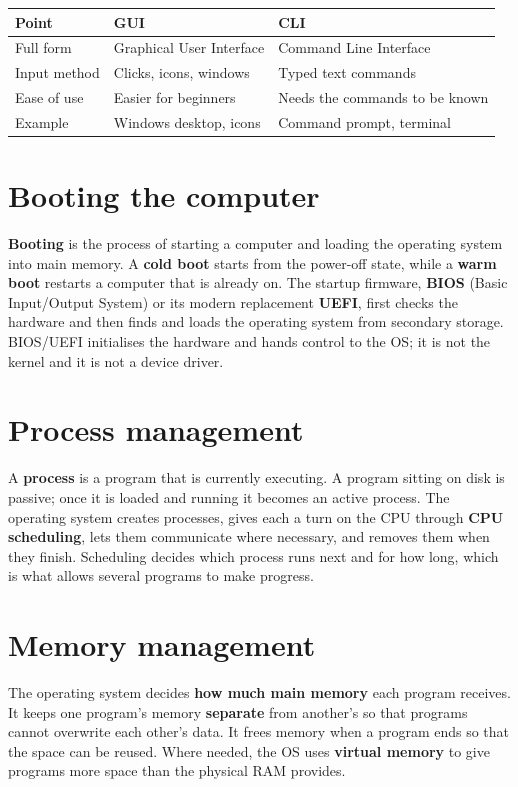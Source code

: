 \documentclass[11pt]{article}
\begin{document}
\begin{center}
\begin{tabular}{p{}p{}p{}}
\toprule
\textbf{Point} & \textbf{GUI} & \textbf{CLI} \\
\midrule
Full form & Graphical User Interface & Command Line Interface \\
Input method & Clicks, icons, windows & Typed text commands \\
Ease of use & Easier for beginners & Needs the commands to be known \\
Example & Windows desktop, icons & Command prompt, terminal \\
\bottomrule
\end{tabular}
\end{center}

\section{Booting the computer}
\textbf{Booting} is the process of starting a computer and loading the
operating system into main memory. A \textbf{cold boot} starts from the
power-off state, while a \textbf{warm boot} restarts a computer that is already
on. The startup firmware, \textbf{BIOS} (Basic Input/Output System) or its
modern replacement \textbf{UEFI}, first checks the hardware and then finds and
loads the operating system from secondary storage. BIOS/UEFI initialises the
hardware and hands control to the OS; it is not the kernel and it is not a
device driver.

\section{Process management}
A \textbf{process} is a program that is currently executing. A program sitting
on disk is passive; once it is loaded and running it becomes an active
process. The operating system creates processes, gives each a turn on the CPU
through \textbf{CPU scheduling}, lets them communicate where necessary, and
removes them when they finish. Scheduling decides which process runs next and
for how long, which is what allows several programs to make progress.

\section{Memory management}
The operating system decides \textbf{how much main memory} each program
receives. It keeps one program's memory \textbf{separate} from another's so
that programs cannot overwrite each other's data. It frees memory when a
program ends so that the space can be reused. Where needed, the OS uses
\textbf{virtual memory} to give programs more space than the physical RAM
provides.
\end{document}
